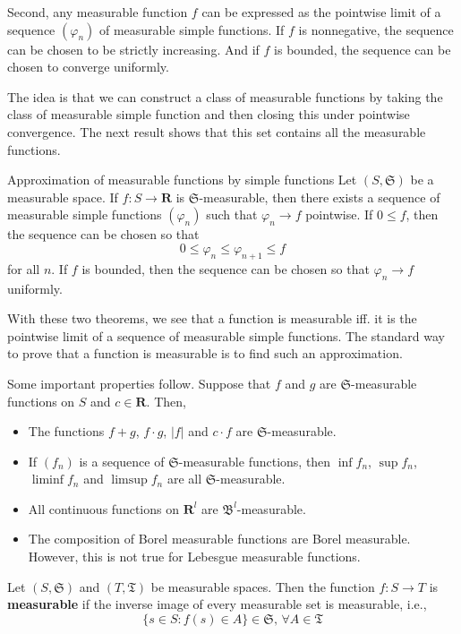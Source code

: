 Second, any measurable function $f$ can be expressed as the pointwise limit of a sequence $(\varphi_n)$ of measurable simple functions. If $f$ is nonnegative, the sequence can be chosen to be strictly increasing. And if $f$ is bounded, the sequence can be chosen to converge uniformly.

The idea is that we can construct a class of measurable functions by taking the class of measurable simple function and then closing this under pointwise convergence. The next result shows that this set contains all the measurable functions.

\begin{theorem}[]{Approximation of measurable functions by simple functions}{}
	Let $(S, \mathfrak{S})$ be a measurable space. If $f : S \longrightarrow \textbf{R}$ is $\mathfrak{S}$-measurable, then there exists a sequence of measurable simple functions $(\varphi_n)$ such that $\varphi_n \longrightarrow f$ pointwise. If $0 \leq f$, then the sequence can be chosen so that 
	\[
		0 \leq \varphi_n \leq \varphi_{n+1} \leq f
	\]
	for all $n$. If $f$ is bounded, then the sequence can be chosen so that $\varphi_n \longrightarrow f$ uniformly.
\end{theorem}

With these two theorems, we see that a function is measurable iff. it is the pointwise limit of a sequence of measurable simple functions. The standard way to prove that a function is measurable is to find such an approximation.

Some important properties follow. Suppose that $f$ and $g$ are $\mathfrak{S}$-measurable functions on $S$ and $c \in \textbf{R}$. Then,
\begin{itemize}
	\item The functions $f + g$, $f \cdot g$, $|f|$ and $c \cdot f$ are $\mathfrak{S}$-measurable.
	\item If $(f_n)$ is a sequence of $\mathfrak{S}$-measurable functions, then $\inf f_n$, $\sup f_n$, $\liminf f_n$ and $\limsup f_n$ are all $\mathfrak{S}$-measurable.
	\item All continuous functions on $\textbf{R}^l$ are $\mathfrak{B}^l$-measurable.
	\item The composition of Borel measurable functions are Borel measurable. However, this is not true for Lebesgue measurable functions.
\end{itemize}

\begin{definition}[]{}{}
	Let $(S, \mathfrak{S})$ and $(T, \mathfrak{T})$ be measurable spaces. Then the function $f : S \longrightarrow T$ is \textbf{measurable} if the inverse image of every measurable set is measurable, i.e., 
	\[
		\{ s \in S : f(s) \in A \} \in \mathfrak{S}, \, \forall A \in \mathfrak{T}
	\]
\end{definition}

